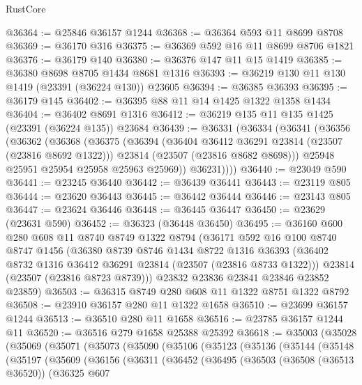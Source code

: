 \begin{lexlean}{RustCore}
\begin{coremodule}
@36364 := @25846 @36157 @1244
@36368 := @36364 @593 @11 @8699 @8708
@36369 := @36170 @316
@36375 := @36369 @592 @16 @11 @8699 @8706 @1821
@36376 := @36179 @140
@36380 := @36376 @147 @11 @15 @1419
@36385 := @36380 @8698 @8705 @1434 @8681 @1316
@36393 := @36219 @130 @11 @130 @1419 (@23391 (@36224 @130)) @23605
@36394 := @36385 @36393
@36395 := @36179 @145
@36402 := @36395 @88 @11 @14 @1425 @1322 @1358 @1434
@36404 := @36402 @8691 @1316
@36412 := @36219 @135 @11 @135 @1425 (@23391 (@36224 @135)) @23684
@36439 := @36331
    (@36334
      (@36341
        (@36356
          (@36362
            (@36368
              (@36375
                (@36394
                  (@36404 @36412 @36291 @23814 (@23507 (@23816 @8692 @1322)))
                  @23814
                  (@23507 (@23816 @8682 @8698)))
                @25948
                @25951
                @25954
                @25958
                @25963
                @25969))
            @36231))))
@36440 := @23049 @590
@36441 := @23245 @36440
@36442 := @36439 @36441
@36443 := @23119 @805
@36444 := @23620 @36443
@36445 := @36442 @36444
@36446 := @23143 @805
@36447 := @23624 @36446
@36448 := @36445 @36447
@36450 := @23629 (@23631 @590)
@36452 := @36323 (@36448 @36450)
@36495 := @36160
    @600
    @280
    @608
    @11
    @8740
    @8749
    @1322
    @8794
    (@36171
      @592
      @16
      @100
      @8740
      @8747
      @1456
      (@36380
        @8739
        @8746
        @1434
        @8722
        @1316
        @36393
        (@36402 @8732 @1316 @36412 @36291 @23814 (@23507 (@23816 @8733 @1322)))
        @23814
        (@23507 (@23816 @8723 @8739)))
      @23832
      @23836
      @23841
      @23846
      @23852
      @23859)
@36503 := @36315 @8749 @280 @608 @11 @1322 @8751 @1322 @8792
@36508 := @23910 @36157 @280 @11 @1322 @1658
@36510 := @23699 @36157 @1244
@36513 := @36510 @280 @11 @1658
@36516 := @23785 @36157 @1244 @11
@36520 := @36516 @279 @1658 @25388 @25392
@36618 := @35003
    (@35028
      (@35069
        (@35071
          (@35073
            (@35090
              (@35106
                (@35123
                  (@35136
                    (@35144
                      (@35148
                        (@35197
                          (@35609
                            (@36156
                              (@36311
                                (@36452
                                  (@36495
                                    (@36503
                                      (@36508 (@36513 @36520))
                                      (@36325
                                        @607

\end{coremodule}
\end{lexlean}

